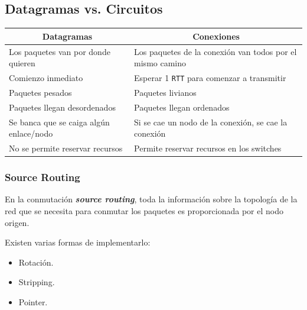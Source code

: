 \documentclass[]{article}
\begin{document}
\subsection{Datagramas vs. Circuitos}
\begin{center}
    \begin{table}[h]
        \begin{tabular}{|l|l|}
            \hline
            \multicolumn{1}{|c|}{\textbf{Datagramas}} & \multicolumn{1}{c|}{\textbf{Conexiones}}                  \\ \hline
            Los paquetes van por donde quieren        & Los paquetes de la conexión van todos por el mismo camino \\ \hline
            Comienzo inmediato                        & Esperar 1 \texttt{RTT} para comenzar a transmitir         \\ \hline
            Paquetes pesados                          & Paquetes livianos                                         \\ \hline
            Paquetes llegan desordenados              & Paquetes llegan ordenados                                 \\ \hline
            Se banca que se caiga algún enlace/nodo   & Si se cae un nodo de la conexión, se cae la conexión      \\ \hline
            No se permite reservar recursos           & Permite reservar recursos en los switches                 \\ \hline
        \end{tabular}
    \end{table}
\end{center}


\subsubsection{Source Routing}
En la conmutación \textbf{\emph{source routing}}, toda la información sobre la topología de la red que se necesita para conmutar los paquetes es proporcionada por el nodo origen.

Existen varias formas de implementarlo:
\begin{itemize}
    \item Rotación.
    \item Stripping.
    \item Pointer.
\end{itemize}

\end{document}
